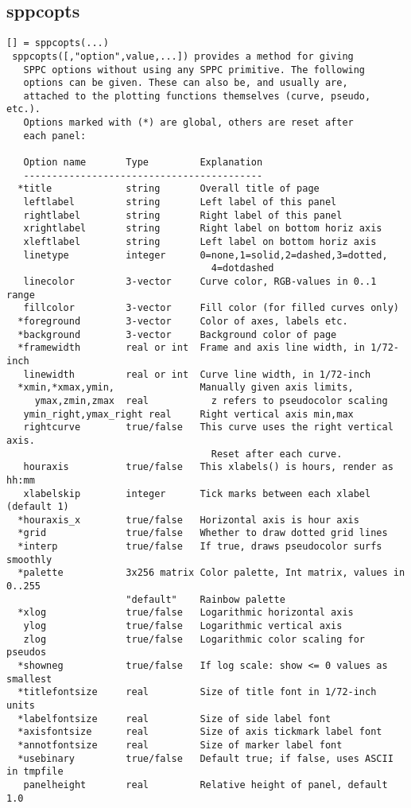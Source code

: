 \documentclass[a4paper]{article}
\begin{document}
\subsection{sppcopts\label{sppcopts}}

\begin{tscreen}
\begin{verbatim}
[] = sppcopts(...)
 sppcopts([,"option",value,...]) provides a method for giving
   SPPC options without using any SPPC primitive. The following
   options can be given. These can also be, and usually are,
   attached to the plotting functions themselves (curve, pseudo, etc.).
   Options marked with (*) are global, others are reset after
   each panel:

   Option name       Type         Explanation
   ------------------------------------------
  *title             string       Overall title of page
   leftlabel         string       Left label of this panel
   rightlabel        string       Right label of this panel
   xrightlabel       string       Right label on bottom horiz axis
   xleftlabel        string       Left label on bottom horiz axis
   linetype          integer      0=none,1=solid,2=dashed,3=dotted,
                                    4=dotdashed
   linecolor         3-vector     Curve color, RGB-values in 0..1 range
   fillcolor         3-vector     Fill color (for filled curves only)
  *foreground        3-vector     Color of axes, labels etc.
  *background        3-vector     Background color of page
  *framewidth        real or int  Frame and axis line width, in 1/72-inch
   linewidth         real or int  Curve line width, in 1/72-inch
  *xmin,*xmax,ymin,               Manually given axis limits,
     ymax,zmin,zmax  real           z refers to pseudocolor scaling
   ymin_right,ymax_right real     Right vertical axis min,max
   rightcurve        true/false   This curve uses the right vertical axis.
                                    Reset after each curve.
   houraxis          true/false   This xlabels() is hours, render as hh:mm
   xlabelskip        integer      Tick marks between each xlabel (default 1)
  *houraxis_x        true/false   Horizontal axis is hour axis
  *grid              true/false   Whether to draw dotted grid lines
  *interp            true/false   If true, draws pseudocolor surfs smoothly
  *palette           3x256 matrix Color palette, Int matrix, values in 0..255
                     "default"    Rainbow palette
  *xlog              true/false   Logarithmic horizontal axis
   ylog              true/false   Logarithmic vertical axis
   zlog              true/false   Logarithmic color scaling for pseudos
  *showneg           true/false   If log scale: show <= 0 values as smallest
  *titlefontsize     real         Size of title font in 1/72-inch units
  *labelfontsize     real         Size of side label font
  *axisfontsize      real         Size of axis tickmark label font
  *annotfontsize     real         Size of marker label font
  *usebinary         true/false   Default true; if false, uses ASCII in tmpfile
   panelheight       real         Relative height of panel, default 1.0


\end{verbatim}
\end{tscreen}
\end{document}
